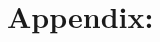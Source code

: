 \documentclass{book}
\theoremstyle{plain}
\theoremstyle{definition}
\begin{document}
% 
% 
% 
% 
% 
% 
% 




\appendix
\newpage
\section*{Appendix:}

% 
\end{document}
